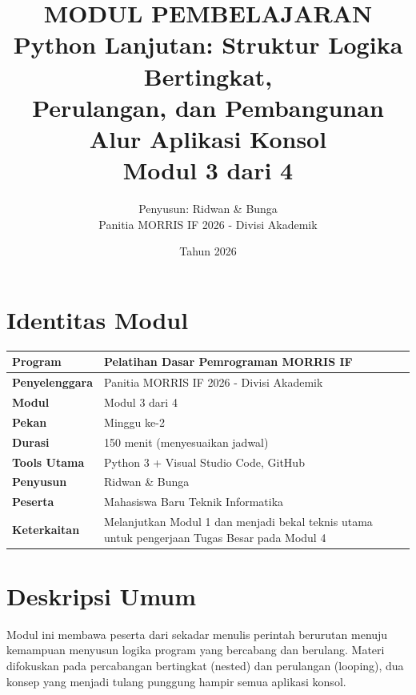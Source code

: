 \documentclass[12pt,a4paper]{article}
\title{
    \vspace{-2cm}
    \textbf{MODUL PEMBELAJARAN}\\[0.5cm]
    \Large \textbf{Python Lanjutan: Struktur Logika Bertingkat,\\
    Perulangan, dan Pembangunan Alur Aplikasi Konsol}\\[0.5cm]
    \large Modul 3 dari 4
}
\author{
    Penyusun: Ridwan \& Bunga\\
    Panitia MORRIS IF 2026 - Divisi Akademik
}
\date{Tahun 2026}
\begin{document}
\maketitle
\thispagestyle{empty}
\newpage

\tableofcontents
\newpage

\section{Identitas Modul}

\begin{table}[h]
\centering
\begin{tabular}{|l|p{10cm}|}
\hline
\textbf{Program} & Pelatihan Dasar Pemrograman MORRIS IF \\
\hline
\textbf{Penyelenggara} & Panitia MORRIS IF 2026 - Divisi Akademik \\
\hline
\textbf{Modul} & Modul 3 dari 4 \\
\hline
\textbf{Pekan} & Minggu ke-2 \\
\hline
\textbf{Durasi} & 150 menit (menyesuaikan jadwal) \\
\hline
\textbf{Tools Utama} & Python 3 + Visual Studio Code, GitHub \\
\hline
\textbf{Penyusun} & Ridwan \& Bunga \\
\hline
\textbf{Peserta} & Mahasiswa Baru Teknik Informatika \\
\hline
\textbf{Keterkaitan} & Melanjutkan Modul 1 dan menjadi bekal teknis utama untuk pengerjaan Tugas Besar pada Modul 4 \\
\hline
\end{tabular}
\end{table}

\section{Deskripsi Umum}

Modul ini membawa peserta dari sekadar menulis perintah berurutan menuju kemampuan menyusun logika program yang bercabang dan berulang. Materi difokuskan pada percabangan bertingkat (nested) dan perulangan (looping), dua konsep yang menjadi tulang punggung hampir semua aplikasi konsol.
\end{document}
